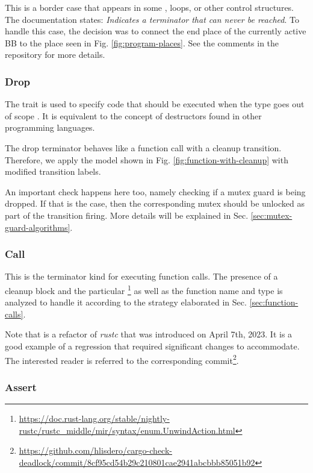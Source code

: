 This is a border case that appears
in some ,  loops, or other control structures.
The documentation states: \emph{Indicates a terminator that can never be reached}.
To handle this case, the decision was to connect
the end place of the currently active \acrshort{BB}
to the  place seen in Fig. \ref{fig:program-places}.
See the comments in the repository for more details.

\subsubsection{Drop}

The  trait is used to specify code that should be executed
when the type goes out of scope \cite[Chap. 15.3]{rust-book}.
It is equivalent to the concept of destructors found in other programming languages.

The drop terminator behaves like a function call with a cleanup transition.
Therefore, we apply the model shown in Fig. \ref{fig:function-with-cleanup}
with modified transition labels.

An important check happens here too, namely checking if a mutex guard is being dropped.
If that is the case, then the corresponding mutex should be unlocked
as part of the transition firing.
More details will be explained in Sec. \ref{sec:mutex-guard-algorithms}.

\subsubsection{Call}

This is the terminator kind for executing function calls.
The presence of a cleanup block and the particular
\footnote{\url{https://doc.rust-lang.org/stable/nightly-rustc/rustc_middle/mir/syntax/enum.UnwindAction.html}}
as well as the function name and type is analyzed to handle it
according to the strategy elaborated in Sec. \ref{sec:function-calls}.

Note that  is a refactor of \emph{rustc}
that was introduced on April 7th, 2023.
It is a good example of a regression that required significant changes to accommodate.
The interested reader is referred to the corresponding
commit\footnote{\url{https://github.com/hlisdero/cargo-check-deadlock/commit/8cf95cd54b29c210801cae2941abcbbb85051b92}}.

\subsubsection{Assert}

